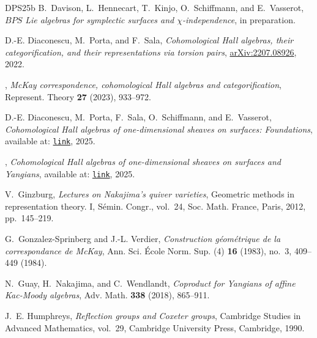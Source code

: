 \documentclass[reqno,a4paper]{amsart}
\theoremstyle{basic-theorem}
\numberwithin{equation}{section}
\begin{document}
\begin{thebibliography}{DPS{\etalchar{+}}25b}
	B.~Davison, L.~Hennecart, T.~Kinjo, O.~Schiffmann, and E.~Vasserot, \textit{$BPS$ Lie algebras for symplectic surfaces and $\chi$-independence}, in preparation.
	
	D.-E. Diaconescu, M.~Porta, and F.~Sala, \textit{Cohomological {H}all algebras, their categorification,
		and their representations via torsion pairs},
	\href{https://arxiv.org/pdf/2207.08926.pdf}{\sf arXiv:2207.08926}, 2022.
	
	\bysame, \textit{Mc{K}ay correspondence, cohomological {H}all algebras and
		categorification}, Represent. Theory \textbf{27} (2023), 933--972.
		
	D.-E. Diaconescu, M.~Porta, F.~Sala, O.~Schiffmann, and E.~Vasserot, \textit{Cohomological {H}all algebras of one-dimensional sheaves on
		surfaces: Foundations}, available at:
	\href{https://web.dm.unipi.it/sala/assets/pdf/COHA_Foundations.pdf}{\texttt{link}},
	2025.
	
	\bysame,
	\textit{Cohomological {H}all algebras of one-dimensional sheaves on surfaces
		and {Y}angians}, available at:
	\href{https://web.dm.unipi.it/sala/assets/pdf/COHA_Yangians.pdf}{\texttt{link}},
	2025.
	
	V.~Ginzburg, \textit{Lectures on {N}akajima's quiver varieties}, Geometric
	methods in representation theory. {I}, S\'{e}min. Congr., vol.~24, Soc. Math.
	France, Paris, 2012, pp.~145--219.
	
	G.~Gonzalez-Sprinberg and J.-L. Verdier, \textit{Construction g\'{e}om\'{e}trique
		de la correspondance de {M}c{K}ay}, Ann. Sci. \'{E}cole Norm. Sup. (4)
	\textbf{16} (1983), no.~3, 409--449 (1984).
	
	N.~Guay, H.~Nakajima, and C.~Wendlandt, \textit{Coproduct for {Y}angians of
		affine {K}ac-{M}oody algebras}, Adv. Math. \textbf{338} (2018), 865--911.
	
	
	J.~E. Humphreys, \textit{Reflection groups and {C}oxeter groups}, Cambridge
	Studies in Advanced Mathematics, vol.~29, Cambridge University Press,
	Cambridge, 1990.
	

\end{thebibliography}
\end{document}

